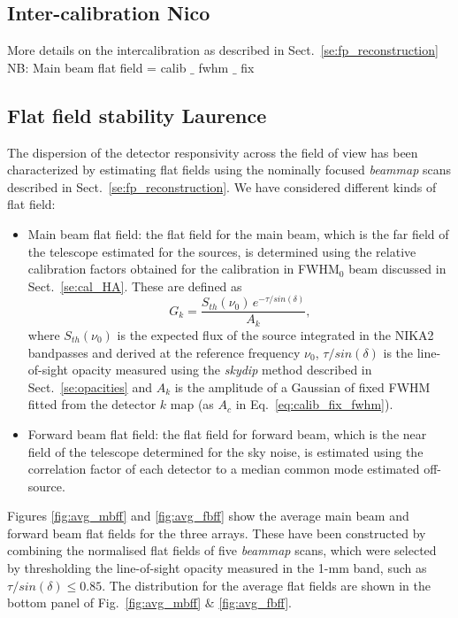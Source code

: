 
\subsection{Inter-calibration {\color{blue} Nico}}
\label{se:intercalibration}

{\color{blue} More details on the intercalibration as described in Sect.~\ref{se:fp_reconstruction}} \\

{\color{blue} NB: Main beam flat field = calib $\_$ fwhm $\_$ fix}


\subsection{Flat field stability {\color{blue} Laurence} }
\label{se:flatfields}

The dispersion of the detector responsivity across the field of view has been characterized by estimating flat fields using the nominally focused \emph{beammap} scans described in Sect.~\ref{se:fp_reconstruction}. We have considered different kinds of flat field:
\begin{itemize}
\item Main beam flat field: the flat field for the main beam, which is the far field of the telescope estimated for the sources, is determined using the relative calibration factors obtained for the calibration in FWHM$_{0}$ beam discussed in Sect.~\ref{se:cal_HA}. These are defined as
  \begin{equation}
    G_k = \frac{S_{th}(\nu_0)\, e^{-\tau/sin(\delta)}}{A_k}, 
  \end{equation}
  where $S_{th}(\nu_0)$ is the expected flux of the source integrated in the NIKA2 bandpasses and derived at the reference frequency $\nu_0$, $\tau/sin(\delta)$ is the line-of-sight opacity measured using the \emph{skydip} method described in Sect.~\ref{se:opacities} and $A_k$ is the amplitude of a Gaussian of fixed FWHM fitted from the detector $k$ map (as $A_{c}$ in Eq.~\ref{eq:calib_fix_fwhm}).
\item Forward beam flat field: the flat field for forward beam, which is the near field of the telescope determined for the sky noise, is estimated using the correlation factor of each detector to a median common mode estimated off-source.
\end{itemize}

Figures \ref{fig:avg_mbff} and \ref{fig:avg_fbff} show the average main beam and forward beam flat fields for the three arrays. These have been constructed by combining the normalised flat fields of five \emph{beammap} scans, which were selected by thresholding the line-of-sight opacity measured in the 1-mm band, such as $\tau/sin(\delta) \leq 0.85$. The distribution for the average flat fields are shown in the bottom panel of Fig.~\ref{fig:avg_mbff} $\&$ \ref{fig:avg_fbff}.

